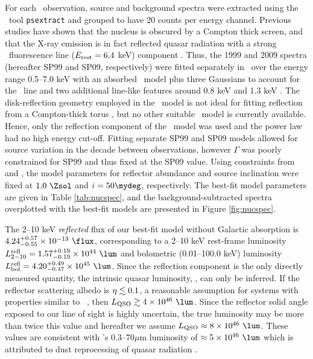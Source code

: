 \documentclass[useAMS,usenatbib]{mn2e}
\begin{document}
For each \cxo\ observation, source and background spectra were
extracted using the \ciao\ tool {\tt psextract} and grouped to have 20
counts per energy channel. Previous studies have shown that the
nucleus is obscured by a Compton thick screen, and that the X-ray
emission is in fact reflected quasar radiation with a strong
\feka\ fluorescence line ($E_{\rm{rest}} = 6.4$ keV) component
\citep[\eg][]{2000A&A...353..910F, 2001MNRAS.321L..15I}. Thus, the
1999 and 2009 spectra (hereafter SP99 and SP09, respectively) were
fitted separately in \xspec\ over the energy range 0.5--7.0 keV with
an absorbed \pexrav\ model \citep{pexrav} plus three Gaussians to
account for the \feka\ line and two additional line-like features
around 0.8 keV and 1.3 keV \citep[see
  also][]{2001MNRAS.321L..15I}. The disk-reflection geometry employed
in the \pexrav\ model is not ideal for fitting reflection from a
Compton-thick torus \citep{2009MNRAS.397.1549M}, but no other suitable
\xspec\ model is currently available. Hence, only the reflection
component of the \pexrav\ model was used and the power law had no high
energy cut-off. Fitting separate SP99 and SP09 models allowed for
source variation in the decade between observations, however $\Gamma$
was poorly constrained for SP99 and thus fixed at the SP09
value. Using constraints from \citet{1997A&A...318L...1T} and
\citet{2000AJ....120..562T}, the model parameters for reflector
abundance and source inclination were fixed at $1.0 ~\Zsol$ and $i =
50\mydeg$, respectively. The best-fit model parameters are given in
Table \ref{tab:nucspec}, and the background-subtracted spectra
overplotted with the best-fit models are presented in Figure
\ref{fig:nucspec}.

The 2--10 keV {\it{reflected}} flux of our best-fit model without
Galactic absorption is $4.24^{+0.57}_{-0.55} \times 10^{-13} ~\flux$,
corresponding to a 2--10 keV rest-frame luminosity
$L^{\rm{refl}}_{2-10} = 1.57^{+0.19}_{-0.19} \times 10^{44} ~\lum$ and
bolometric (0.01--100.0 keV) luminosity $L_{\rm{bol}}^{\rm{refl}} =
4.20^{+0.49}_{-0.47} \times 10^{45} ~\lum$. Since the reflection
component is the only directly measured quantity, the intrinsic quasar
luminosity, \lqso, can only be inferred. If the reflector scattering
albedo is $\eta \lesssim 0.1$, a reasonable assumption for systems with
properties similar to \irs\ \citep{2009MNRAS.397.1549M}, then $\lqso
\ga 4 \times 10^{46} ~\lum$. Since the reflector solid angle exposed
to our line of sight is highly uncertain, the true luminosity may be
more than twice this value and hereafter we assume $\lqso \approx 8
\times 10^{46} ~\lum$. These values are consistent with \irs's
0.3--70$\mu$m luminosity of $\approx 5 \times 10^{46} ~\lum$ which is
attributed to dust reprocessing of quasar radiation
\citep[][H99]{1988ApJ...328..161K}.
\end{document}
